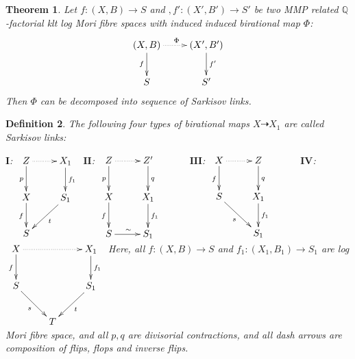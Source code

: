 \documentclass{article}
\newtheorem{defn}{Definition}[subsection]
\newtheorem{thm}[defn]{Theorem}
\newtheorem{rmk}[defn]{Remark}
\begin{document}
\begin{thm}\label{main}
  Let $ f:(X,B)\to S$ and $,f':(X',B')\to S' $ be two MMP related $ \mathbb{Q} $-factorial klt log Mori fibre spaces with induced induced  birational map $\Phi$:
  \[ \xymatrix{
    (X,B)\ar[d]_f\ar@{.>}[r]^\Phi&(X',B')\ar[d]^{f'}\\
    S&S'} \]
  Then $ \Phi  $ can be decomposed into sequence of Sarkisov links.
  \end{thm}

\begin{defn}
  The following four types of  birational maps $X\dashrightarrow X_1$ are called Sarkisov links: 

  $\textbf{I}$:
  $\xymatrix{
    Z\ar[d]_p\ar@{.>}[r]&X_1\ar[d]^{f_1}\\
    X\ar[d]_f&S_1\ar[dl]^{t}\\
  S &}$
  $\textbf{II}$:
  $\xymatrix{
    Z\ar[d]_p\ar@{.>}[r]&Z'\ar[d]^{q}&\\
    X\ar[d]_{f}&X_1\ar[d]^{f_1}\\
    S\ar[r]^{\sim}&S_1}$
  $\textbf{III}$:
  $
  \xymatrix{
    X\ar@{.>}[r]\ar[d]_f& Z\ar[d]^q& \\
    S\ar[rd]_{s}         & X_{1}\ar[d]^{f_{1}}&\\
    &S_{1}
  }
  $
  $\textbf{IV}$:
  $\xymatrix{
    X\ar[d]_f\ar@{.>}[rr]&&X_1\ar[d]^{f_1}\\
    S\ar[dr]_{s}&&S_1\ar[dl]^{t}\\
    &T &}$
  Here, all $ f:(X,B)\to S $ and $ f_1:(X_1,B_1)\to S_1 $ are log Mori fibre space, and all $ p,q $ are divisorial contractions, and all dash arrows are composition of flips, flops and inverse flips. 
\end{defn}
\end{document}
